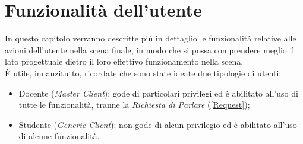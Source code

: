 \chapter{Funzionalità dell'utente}
In questo capitolo verranno descritte più in dettaglio le funzionalità relative alle azioni dell'utente nella scena finale, in modo che si possa comprendere meglio il lato progettuale dietro il loro effettivo funzionamento nella scena.
\\È utile, innanzitutto, ricordate che sono state ideate due tipologie di utenti: 
\begin{itemize}
    \item Docente (\textit{Master Client}): gode di particolari privilegi ed è abilitato all'uso di tutte le funzionalità, tranne la \textit{Richiesta di Parlare} (\ref{Request});
    \item Studente (\textit{Generic Client}): non gode di alcun privilegio ed è abilitato all'uso di alcune funzionalità.
\end{itemize}
